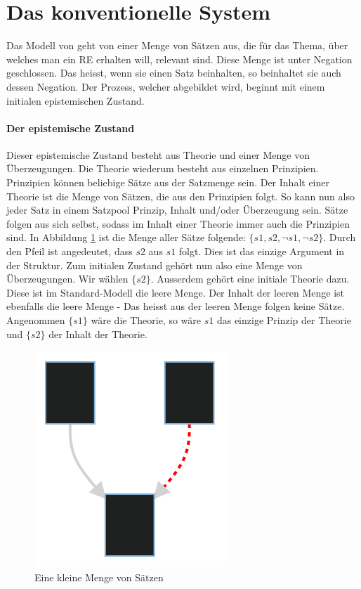 \documentclass{article}
\begin{document}
\section{Das konventionelle System}

Das Modell von \citeauthor{beisbart_making_2021} geht von einer Menge von Sätzen aus, die für das Thema, über welches man ein RE erhalten will, relevant sind. Diese Menge ist unter Negation geschlossen. Das heisst, wenn sie einen Satz beinhalten, so beinhaltet sie auch dessen Negation.
Der Prozess, welcher abgebildet wird, beginnt mit einem initialen epistemischen Zustand.

\paragraph{Der epistemische Zustand} Dieser epistemische Zustand besteht aus Theorie und einer Menge von Überzeugungen. Die Theorie wiederum besteht aus einzelnen Prinzipien. Prinzipien können beliebige Sätze aus der Satzmenge sein. Der Inhalt einer Theorie ist die Menge von Sätzen, die aus den Prinzipien folgt. So kann nun also jeder Satz in einem Satzpool Prinzip, Inhalt und/oder Überzeugung sein. Sätze folgen aus sich selbst, sodass im Inhalt einer Theorie immer auch die Prinzipien sind. In Abbildung \ref{fig:smallset} ist die Menge aller Sätze folgende: $\{s1,s2,\neg s1, \neg s2\}$. Durch den Pfeil ist angedeutet, dass $s2$ aus $s1$ folgt. Dies ist das einzige Argument in der Struktur. Zum initialen Zustand gehört nun also eine Menge von Überzeugungen. Wir wählen $\{s2\}$. Ausserdem gehört eine initiale Theorie dazu. Diese ist im Standard-Modell die leere Menge. Der Inhalt der leeren Menge ist ebenfalls die leere Menge - Das heisst aus der leeren Menge folgen keine Sätze. Angenommen $\{s1\}$ wäre die Theorie, so wäre $s1$ das einzige Prinzip der Theorie und $\{s2\}$ der Inhalt der Theorie.

\begin{figure}[ht]
  \centering
  \includegraphics{figure1}
  \caption{Eine kleine Menge von Sätzen\label{fig:smallset}}
\end{figure}
\end{document}
